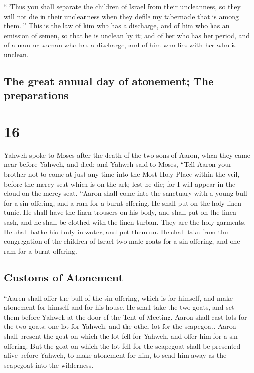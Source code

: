  ``\,`Thus you shall separate the children of Israel from
their uncleanness, so they will not die in their uncleanness when they
defile my tabernacle that is among them.'\,''  This is
the law of him who has a discharge, and of him who has an emission of
semen, so that he is unclean by it;  and of her who has
her period, and of a man or woman who has a discharge, and of him who
lies with her who is unclean.

\hypertarget{the-great-annual-day-of-atonement-the-preparations}{%
\subsection{The great annual day of atonement; The
preparations}\label{the-great-annual-day-of-atonement-the-preparations}}

\hypertarget{section-15}{%
\section{16}\label{section-15}}

 Yahweh spoke to Moses after the death of the two sons of
Aaron, when they came near before Yahweh, and died;  and
Yahweh said to Moses, ``Tell Aaron your brother not to come at just any
time into the Most Holy Place within the veil, before the mercy seat
which is on the ark; lest he die; for I will appear in the cloud on the
mercy seat.  ``Aaron shall come into the sanctuary with a
young bull for a sin offering, and a ram for a burnt offering.
 He shall put on the holy linen tunic. He shall have the
linen trousers on his body, and shall put on the linen sash, and he
shall be clothed with the linen turban. They are the holy garments. He
shall bathe his body in water, and put them on.  He shall
take from the congregation of the children of Israel two male goats for
a sin offering, and one ram for a burnt offering.

\hypertarget{customs-of-atonement}{%
\subsection{Customs of Atonement}\label{customs-of-atonement}}

 ``Aaron shall offer the bull of the sin offering, which
is for himself, and make atonement for himself and for his house.
 He shall take the two goats, and set them before Yahweh
at the door of the Tent of Meeting.  Aaron shall cast lots
for the two goats: one lot for Yahweh, and the other lot for the
scapegoat.  Aaron shall present the goat on which the lot
fell for Yahweh, and offer him for a sin offering.  But
the goat on which the lot fell for the scapegoat shall be presented
alive before Yahweh, to make atonement for him, to send him away as the
scapegoat into the wilderness.

